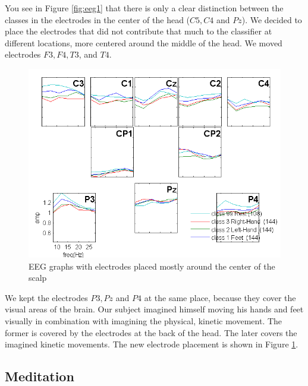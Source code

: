 \documentclass[12pt]{article}
\begin{document}
 You see in Figure \ref{fig:eeg1} that there is only a clear distinction between the classes in the electrodes in the center of the head ($C5, C4$ and $Pz$). We decided to place the electrodes that did not contribute that much to the classifier at different locations, more centered around the middle of the head. We moved electrodes $F3, F4, T3$, and $T4$.
 
 \begin{figure}[h!]
 	\caption{EEG graphs with electrodes placed mostly around the center of the scalp}
 	\label{fig:eeg2}
 	\includegraphics[scale=0.6,center]{eeg_graphs2.png}
 \end{figure}
 
 We kept the electrodes $P3, Pz$ and $P4$ at the same place, because they cover the visual areas of the brain. Our subject imagined himself moving his hands and feet visually in combination with imagining the physical, kinetic movement. The former is covered by the electrodes at the back of the head. The later covers the imagined kinetic movements. The new electrode placement is shown in Figure \ref{fig:eeg2}.

\subsection{Meditation}
\end{document}
